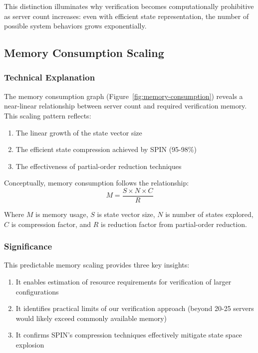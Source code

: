 This distinction illuminates why verification becomes computationally prohibitive as server count increases: even with efficient state representation, the number of possible system behaviors grows exponentially.

\subsection{Memory Consumption Scaling}

\subsubsection{Technical Explanation}

The memory consumption graph (Figure~\ref{fig:memory-consumption}) reveals a near-linear relationship between server count and required verification memory. This scaling pattern reflects:

\begin{enumerate}
    \item The linear growth of the state vector size
    \item The efficient state compression achieved by SPIN (95-98\%)
    \item The effectiveness of partial-order reduction techniques
\end{enumerate}

Conceptually, memory consumption follows the relationship:
\begin{equation}
M = \frac{S \times N \times C}{R}
\end{equation}

Where $M$ is memory usage, $S$ is state vector size, $N$ is number of states explored, $C$ is compression factor, and $R$ is reduction factor from partial-order reduction.

\subsubsection{Significance}

This predictable memory scaling provides three key insights:
\begin{enumerate}
    \item It enables estimation of resource requirements for verification of larger configurations
    \item It identifies practical limits of our verification approach (beyond 20-25 servers would likely exceed commonly available memory)
    \item It confirms SPIN's compression techniques effectively mitigate state space explosion
\end{enumerate}

